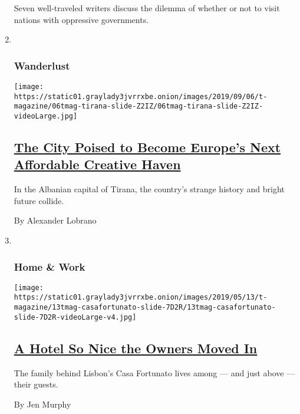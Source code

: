\begin{enumerate}
  Seven well-traveled writers discuss the dilemma of whether or not to
  visit nations with oppressive governments.
\item ~
  \hypertarget{wanderlust}{%
  \subsubsection{Wanderlust}\label{wanderlust}}

  \texttt{[image: https://static01.graylady3jvrrxbe.onion/images/2019/09/06/t-magazine/06tmag-tirana-slide-Z2IZ/06tmag-tirana-slide-Z2IZ-videoLarge.jpg]}

  \hypertarget{the-city-poised-to-become-europes-next-affordable-creative-haven}{%
  \subsection{\texorpdfstring{\href{/2019/09/06/t-magazine/tirana-albania-travel-guide.html}{The
  City Poised to Become Europe's Next Affordable Creative
  Haven}}{The City Poised to Become Europe's Next Affordable Creative Haven}}\label{the-city-poised-to-become-europes-next-affordable-creative-haven}}

  In the Albanian capital of Tirana, the country's strange history and
  bright future collide.

  By Alexander Lobrano
\item ~
  \hypertarget{home--work}{%
  \subsubsection{Home \& Work}\label{home--work}}

  \texttt{[image: https://static01.graylady3jvrrxbe.onion/images/2019/05/13/t-magazine/13tmag-casafortunato-slide-7D2R/13tmag-casafortunato-slide-7D2R-videoLarge-v4.jpg]}

  \hypertarget{a-hotel-so-nice-the-owners-moved-in}{%
  \subsection{\texorpdfstring{\href{/2019/05/07/t-magazine/casa-fortunato-lisbon-hotel.html}{A
  Hotel So Nice the Owners Moved
  In}}{A Hotel So Nice the Owners Moved In}}\label{a-hotel-so-nice-the-owners-moved-in}}

  The family behind Lisbon's Casa Fortunato lives among --- and just
  above --- their guests.

  By Jen Murphy
\end{enumerate}

